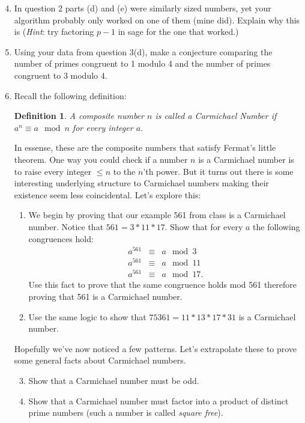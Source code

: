 \documentclass[11pt]{article}
\newtheorem{definition}{Definition}
\begin{document}
\begin{enumerate}
  \setcounter{enumi}{3}
  \item{
  In question 2 parts (d) and (e) were similarly sized numbers, yet your algorithm probably only worked on one of them (mine did).  Explain why this is (\textit{Hint}: try factoring $p-1$ in sage for the one that worked.)
  }
  \item{
  Using your data from question 3(d), make a conjecture comparing the number of primes congruent to 1 modulo 4 and the number of primes congruent to 3 modulo 4.
  }
  \item{
  Recall the following definition:
  \begin{definition}
    A composite number $n$ is called a \textit{Carmichael Number} if $a^{n}\equiv a\mod n$ for every integer $a$.
  \end{definition}
  In essense, these are the composite numbers that satisfy Fermat's little theorem.   One way you could check if a number $n$ is a Carmichael number is to raise every integer $\le n$ to the $n$'th power.  But it turns out there is some interesting underlying structure to Carmichael numbers making their existence seem less coincidental.  Let's explore this:
  \begin{enumerate}
    \item{
    We begin by proving that our example 561 from class is a Carmichael number.  Notice that $561 = 3*11*17$.  Show that for every $a$ the following congruences hold:
    \begin{eqnarray*}
      a^{561}&\equiv& a\mod 3\\
      a^{561}&\equiv& a\mod 11\\
      a^{561}&\equiv& a\mod 17.
    \end{eqnarray*}
    Use this fact to prove that the same congruence holds mod 561 therefore proving that 561 is a Carmichael number.
    }
    \item{
    Use the same logic to show that $75361 = 11*13*17*31$ is a Carmichael number.
    }
  \end{enumerate}
  Hopefully we've now noticed a few patterns.  Let's extrapolate these to prove some general facts about Carmichael numbers.
  \begin{enumerate}
    \setcounter{enumii}{2}
    \item{
    Show that a Carmichael number must be odd.
    }
    \item{
    Show that a Carmichael number must factor into a product of distinct prime numbers (such a number is called \textit{square free}).
}
\end{enumerate}}
\end{enumerate}
\end{document}

